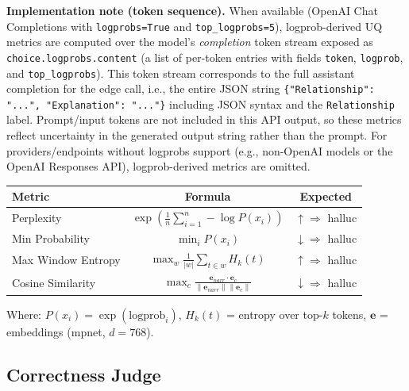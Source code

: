 \textbf{Implementation note (token sequence).} When available (OpenAI Chat Completions with \texttt{logprobs=True} and \texttt{top\_logprobs=5}), logprob-derived UQ metrics are computed over the model's \emph{completion} token stream exposed as \texttt{choice.logprobs.content} (a list of per-token entries with fields \texttt{token}, \texttt{logprob}, and \texttt{top\_logprobs}). This token stream corresponds to the full assistant completion for the edge call, i.e., the entire JSON string \texttt{\{"Relationship": "...", "Explanation": "..."\}} including JSON syntax and the \texttt{Relationship} label. Prompt/input tokens are not included in this API output, so these metrics reflect uncertainty in the generated output string rather than the prompt. For providers/endpoints without logprobs support (e.g., non-OpenAI models or the OpenAI Responses API), logprob-derived metrics are omitted.

\begin{table}[H]
\centering
\footnotesize
\begin{tabular}{@{}lcc@{}}
\toprule
\textbf{Metric} & \textbf{Formula} & \textbf{Expected} \\
\midrule
Perplexity & $\displaystyle\exp\left(\frac{1}{n}\sum_{i=1}^{n} -\log P(x_i)\right)$ & $\uparrow \Rightarrow$ halluc \\[1.5ex]
Min Probability & $\displaystyle\min_i P(x_i)$ & $\downarrow \Rightarrow$ halluc \\[1.5ex]
Max Window Entropy & $\displaystyle\max_w \frac{1}{|w|} \sum_{t \in w} H_k(t)$ & $\uparrow \Rightarrow$ halluc \\[1.5ex]
Cosine Similarity & $\displaystyle\max_c \frac{\mathbf{e}_{narr} \cdot \mathbf{e}_c}{\|\mathbf{e}_{narr}\| \|\mathbf{e}_c\|}$ & $\downarrow \Rightarrow$ halluc \\
\bottomrule
\end{tabular}
\end{table}

Where: $P(x_i) = \exp(\text{logprob}_i)$, $H_k(t)$ = entropy over top-$k$ tokens, $\mathbf{e}$ = embeddings (mpnet, $d=768$).

\subsection{Correctness Judge}
\label{sec:correctness_judge}

